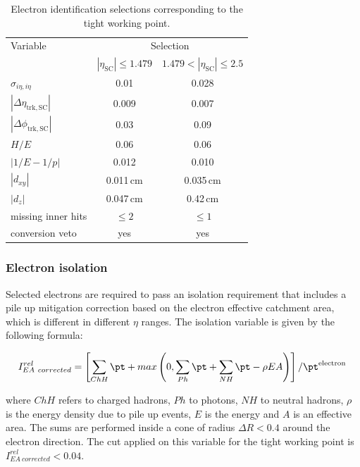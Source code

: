 \begin{table}[htb]
\caption{Electron identification selections corresponding to the tight working point.}\label{tab:tightele}
\begin{tabular}{lcc}
\toprule
Variable & \multicolumn{2}{c}{Selection}\\
 & $|\eta_\mathrm{SC}|\leq 1.479$ & $1.479 < |\eta_\mathrm{SC}| \leq 2.5$ \\
\midrule
$\sigma_{i\eta,i\eta}$ & 0.01 & 0.028 \\
$|\Delta\eta_\mathrm{trk,SC}|$ & 0.009 & 0.007 \\
$|\Delta\phi_\mathrm{trk,SC}|$ & 0.03 & 0.09 \\
$H/E$ & 0.06 & 0.06 \\
$|1/E - 1/p|$ & 0.012 & 0.010 \\
$|d_{xy}|$ & 0.011\,cm & 0.035\,cm\\
$|d_{z}|$ & 0.047\,cm & 0.42\,cm\\
missing inner hits & $\leq 2$ & $\leq 1$\\
conversion veto & yes & yes \\
\bottomrule
\end{tabular}
\end{table}

\subsubsection{Electron isolation}
Selected electrons are required to pass an isolation requirement that includes a pile up mitigation correction based on the electron effective catchment area, which is different in different $\eta$ ranges. The isolation variable is given by the following formula:

\begin{equation}
I^{rel}_{EA~corrected} = \left[ \sum_{ChH}\pt + max\left( 0, \sum_{Ph}\pt + \sum_{NH}\pt - \rho EA \right) \right]/\pt^\mathrm{electron} \,
\end{equation}

where $ChH$ refers to charged hadrons, $Ph$ to photons, $NH$ to neutral hadrons, $\rho$ is the energy density due to pile up events, $E$ is the energy and $A$ is an effective area. The sums are performed inside a cone of radius $\Delta R < 0.4$ around the electron direction. The cut applied on this variable for the tight working point is $I^{rel}_{EA~corrected} < 0.04$.

